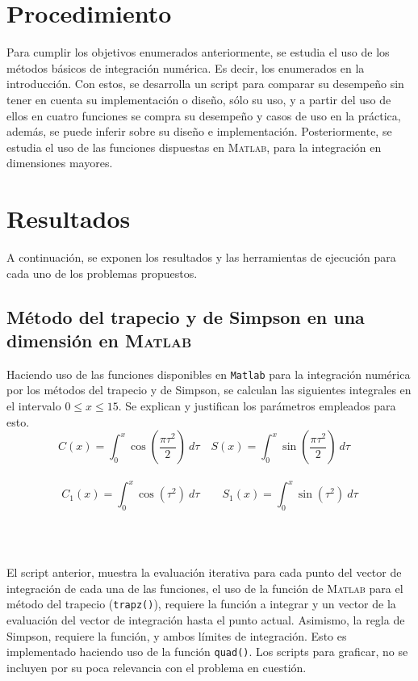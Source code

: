 \documentclass[11pt, spanish]{article}
\begin{document}
\section{Procedimiento}

Para cumplir los objetivos enumerados anteriormente, se estudia el uso de los métodos básicos de integración numérica. Es decir, los enumerados en la introducción. Con estos, se desarrolla un script para comparar su desempeño sin tener en cuenta su implementación o diseño, sólo su uso, y a partir del uso de ellos en cuatro funciones se compra su desempeño y casos de uso en la práctica, además, se puede inferir sobre su diseño e implementación. Posteriormente, se estudia el uso de las funciones dispuestas en \textsc{Matlab}, para la integración en dimensiones mayores.\\

\section{Resultados}

A continuación, se exponen los resultados  y las herramientas de ejecución para cada uno de los problemas propuestos.

\subsection{Método del trapecio y de Simpson en una dimensión en \textsc{Matlab}}

Haciendo uso de las funciones disponibles en \texttt{Matlab} para la integración numérica por los métodos del trapecio y de Simpson, se calculan las siguientes integrales en el intervalo $0 \leq x \leq 15$. Se explican y justifican los parámetros empleados para esto.\\

$$C(x) = \int_{0}^{x} \cos \left(\frac{\pi \tau^2}{2}\right)\ d \tau \quad S(x) = \int_{0}^{x} \sin \left(\frac{\pi \tau^2}{2}\right)\ d \tau \quad $$\
$$C_1(x) = \int_{0}^{x} \cos \left(\tau^2\right)\ d \tau \qquad S_1(x) = \int_{0}^{x} \sin \left(\tau^2\right)\ d \tau$$\

\

El script anterior, muestra la evaluación iterativa para cada punto del vector de integración de cada una de las funciones, el uso de la función de \textsc{Matlab} para el método del trapecio (\texttt{trapz()}), requiere la función a integrar y un vector de la evaluación del vector de integración hasta el punto actual. Asimismo, la regla de Simpson, requiere la función, y ambos límites de integración. Esto es implementado haciendo uso de la función \texttt{quad()}. Los scripts para graficar, no se incluyen por su poca relevancia con el problema en cuestión.\\
\end{document}
